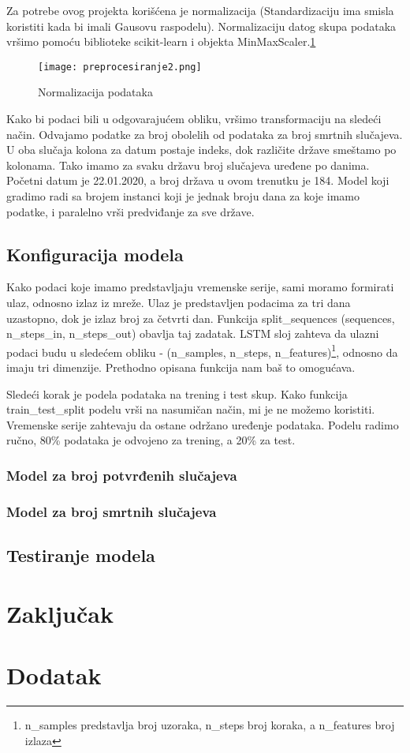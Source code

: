 \documentclass[a4paper]{article}
\begin{document}
Za potrebe ovog projekta korišćena je normalizacija (Standardizaciju ima smisla koristiti kada bi imali Gausovu raspodelu). Normalizaciju datog skupa podataka vršimo pomoću biblioteke scikit-learn i objekta MinMaxScaler.\ref{fig:Pretprocesiranje2}

\begin{figure}[htp]
    \centering
    \texttt{[image: preprocesiranje2.png]}
    \caption{Normalizacija podataka}
    \label{fig:Pretprocesiranje2}
\end{figure}

Kako bi podaci bili u odgovarajućem obliku, vršimo transformaciju na sledeći način. Odvajamo podatke za broj obolelih od podataka za broj smrtnih slučajeva. U oba slučaja kolona za datum postaje indeks, dok različite države smeštamo po kolonama. Tako imamo za svaku državu broj slučajeva uređene po danima. Početni datum je 22.01.2020, a broj država u ovom trenutku je 184. Model koji gradimo radi sa brojem instanci koji je jednak broju dana za koje imamo podatke, i paralelno vrši predviđanje za sve države. 

\subsection{Konfiguracija modela}
Kako podaci koje imamo predstavljaju vremenske serije, sami moramo formirati ulaz, odnosno izlaz iz mreže. Ulaz je predstavljen podacima za tri dana uzastopno, dok je izlaz broj za četvrti dan. 
Funkcija split\_sequences (sequences, n\_steps\_in, n\_steps\_out) obavlja taj zadatak. LSTM sloj zahteva da ulazni podaci budu u sledećem obliku - (n\_samples, n\_steps, n\_features)\footnote{n\_samples predstavlja broj uzoraka, n\_steps broj koraka, a n\_features broj izlaza}, odnosno da imaju tri dimenzije. Prethodno opisana funkcija nam baš to omogućava. 

Sledeći korak je podela podataka na trening i test skup. Kako funkcija train\_test\_split podelu vrši na nasumičan način, mi je ne možemo koristiti. Vremenske serije zahtevaju da ostane održano uređenje podataka. Podelu radimo ručno, 80\% podataka je odvojeno za trening, a 20\% za test. 

\subsubsection{Model za broj potvrđenih slučajeva}

\subsubsection{Model za broj smrtnih slučajeva}

\subsection{Testiranje modela}


\section{Zaključak}
\label{sec:zakljucak}


\appendix
 


\appendix
\section{Dodatak}
\end{document}
